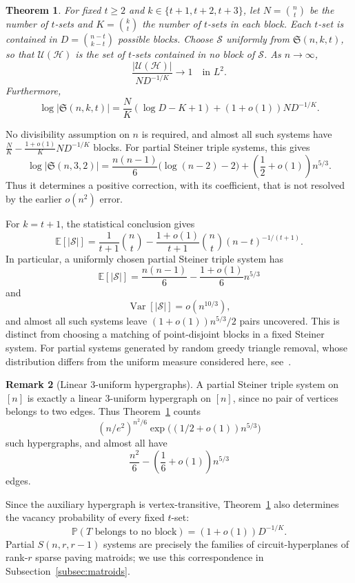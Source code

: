\documentclass[11pt,reqno]{amsart}
\numberwithin{equation}{section}
\theoremstyle{plain}
\newtheorem{theorem}{Theorem}[section]
\theoremstyle{definition}
\newtheorem{remark}[theorem]{Remark}
\newcommand{\calH}{\mathcal{H}}
\newcommand{\calS}{\mathcal{S}}
\newcommand{\E}{\mathbb E}
\newcommand{\Prob}{\mathbb P}
\newcommand{\Var}{\operatorname{Var}}
\newcommand{\calU}{\mathcal U}
\begin{document}
\begin{theorem}\label{thm:partialdesigns}\label{cor:partialsteiner}
    For fixed $t\ge2$ and $k\in\{t+1,t+2,t+3\}$, let $N=\binom nt$ be the number of $t$-sets and $K=\binom kt$ the number of $t$-sets in each block.
    Each $t$-set is contained in $D=\binom{n-t}{k-t}$ possible blocks.
    Choose $\calS$ uniformly from $\mathfrak S(n,k,t)$, so that $\calU(\calH)$ is the set of $t$-sets contained in no block of $\calS$. As $n\to\infty$,
    \[
        \frac{|\calU(\calH)|}{ND^{-1/K}}\to1\quad\text{in }L^2.
    \]
    Furthermore,
    \[
        \log|\mathfrak S(n,k,t)| =\frac NK(\log D-K+1)+(1+o(1))ND^{-1/K}.
    \]
\end{theorem}

No divisibility assumption on $n$ is required, and almost all such systems have $\frac NK-\frac{1+o(1)}KND^{-1/K}$ blocks.
For partial Steiner triple systems, this gives
\[
    \log|\mathfrak S(n,3,2)|=\frac{n(n-1)}6\bigl(\log(n-2)-2\bigr)
    +\left(\frac12+o(1)\right)n^{5/3}.
\]
Thus it determines a positive correction, with its coefficient, that is not resolved by the earlier $o(n^2)$ error.

For $k=t+1$, the statistical conclusion gives
\[
    \E[|\calS|] =\frac1{t+1}\binom nt-\frac{1+o(1)}{t+1}\binom nt(n-t)^{-1/(t+1)}.
\]
In particular, a uniformly chosen partial Steiner triple system has
\[
    \E[|\calS|]=\frac{n(n-1)}6-\frac{1+o(1)}6n^{5/3}
\]
and
\[
    \Var[|\calS|]=o(n^{10/3}),
\]
and almost all such systems leave $(1+o(1))n^{5/3}/2$ pairs uncovered.
This is distinct from choosing a matching of point-disjoint blocks in a fixed Steiner system.
For partial systems generated by random greedy triangle removal, whose distribution differs from the uniform measure considered here, see~\cite{BFL}.

\begin{remark}[Linear $3$-uniform hypergraphs]\label{rem:linear-three-graphs}
    A partial Steiner triple system on $[n]$ is exactly a linear $3$-uniform hypergraph on $[n]$, since no pair of vertices belongs to two edges.
    Thus Theorem~\ref{thm:partialdesigns} counts
    \[
        (n/e^2)^{n^2/6}\exp\bigl((1/2+o(1))n^{5/3}\bigr)
    \]
    such hypergraphs, and almost all have
    \[
        \frac{n^2}{6}-\left(\frac16+o(1)\right)n^{5/3}
    \]
    edges.
\end{remark}

Since the auxiliary hypergraph is vertex-transitive, Theorem~\ref{thm:partialdesigns} also determines the vacancy probability of every fixed $t$-set:
\[
    \Prob(T\text{ belongs to no block})=(1+o(1))D^{-1/K}.
\]
Partial $S(n,r,r-1)$ systems are precisely the families of circuit-hyperplanes of rank-$r$ sparse paving matroids; we use this correspondence in Subsection~\ref{subsec:matroids}.
\end{document}
